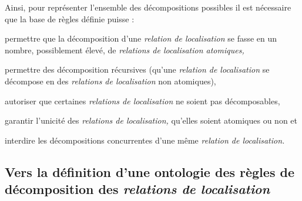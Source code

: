 
Ainsi, pour représenter l'ensemble des décompositions possibles il est
nécessaire que la base de règles définie puisse :
\begin{enumerate*}[label=(\arabic*)]
\item permettre que la décomposition d'une \emph{relation de
    localisation} se fasse en un nombre, possiblement élevé, de
  \emph{relations de localisation atomiques,}
\item permettre des décomposition récursives (\ie qu'une
  \emph{relation de localisation} se décompose en des \emph{relations
    de localisation} non atomiques),
\item autoriser que certaines \emph{relations de localisation} ne soient pas
  décomposables,
\item garantir l'unicité des \emph{relations de localisation,}
  qu'elles soient atomiques ou non et
\item interdire les décompositions concurrentes d'une même
  \emph{relation de localisation.}
\end{enumerate*}




\subsection{Vers la définition d'une ontologie des règles de
  décomposition des \emph{relations de localisation}}

